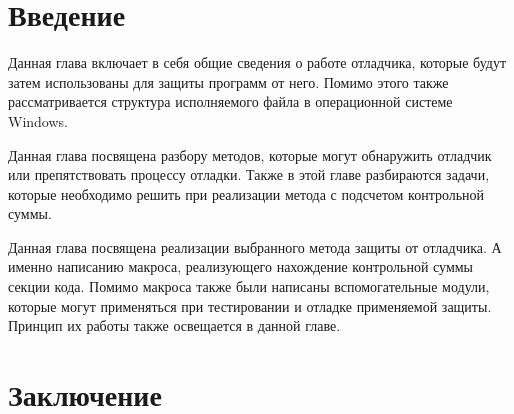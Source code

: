 %



  \newpage

  \tableofcontents
  \newpage

  \chapter*{Введение}
  

  Данная глава включает в себя общие сведения о работе отладчика, которые будут
  затем использованы для защиты программ от него. Помимо этого также
  рассматривается структура исполняемого файла в операционной системе Windows.
  
  
  
  
  

  Данная глава посвящена разбору методов, которые могут обнаружить отладчик или
  препятствовать процессу отладки. Также в этой главе разбираются задачи,
  которые необходимо решить при реализации метода с подсчетом контрольной суммы.
  
  
  
  
  

  Данная глава посвящена реализации выбранного метода защиты от отладчика. А
  именно написанию макроса, реализующего нахождение контрольной суммы секции
  кода. Помимо макроса также были написаны вспомогательные модули, которые
  могут применяться при тестировании и отладке применяемой защиты. Принцип их
  работы также освещается в данной главе.
  
  
  

  

  \chapter*{Заключение}
  

  \appendix
  
  

